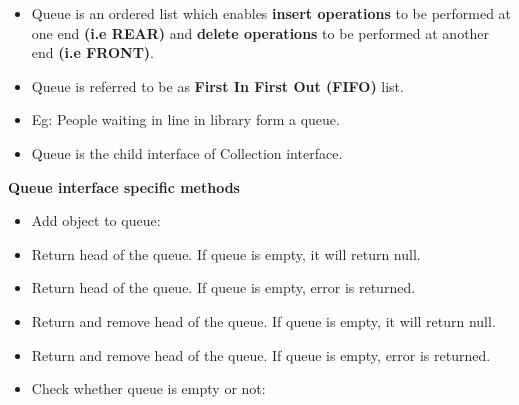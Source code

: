 \setlength{\columnsep}{3pt}
\begin{flushleft}

	\begin{itemize}
		\item Queue is an ordered list which enables \textbf{insert operations} to be performed at one end \textbf{(i.e REAR)} and \textbf{delete operations} to be performed at another end \textbf{(i.e FRONT)}.
		\item Queue is referred to be as \textbf{First In First Out (FIFO)} list.
		\item Eg: People waiting in line in library form a queue.
		
		
	
		
		\item Queue is the child interface of Collection interface.
		
	\end{itemize}
	
	\newpage
	
	\textbf{Queue interface specific methods}
	\begin{itemize}
		\item Add object to queue:
		\bigskip
		\item Return head of the queue. If queue is empty, it will return null.
		\bigskip
		\item Return head of the queue. If queue is empty, error is returned.
		\bigskip
		\item Return and remove head of the queue. If queue is empty, it will return null.
		\bigskip
		\item Return and remove head of the queue. If queue is empty, error is returned.
		\bigskip
		\item Check whether queue is empty or not:
		
	\end{itemize}
	
\end{flushleft}

\newpage

